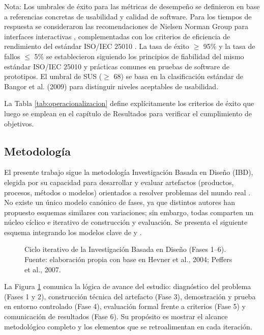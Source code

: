   \endgroup
  Nota: Los umbrales de éxito para las métricas de desempeño se definieron en base a referencias concretas de usabilidad y calidad de software. Para los tiempos de respuesta se consideraron las recomendaciones de Nielsen Norman Group para interfaces interactivas \parencite{NielsenNorman_interaction}, complementadas con los criterios de eficiencia de rendimiento del estándar ISO/IEC 25010 \parencite{ISO25010_2011}. La tasa de éxito $\geq$ 95\% y la tasa de fallos $\leq$ 5\% se establecieron siguiendo los principios de fiabilidad del mismo estándar ISO/IEC 25010 y prácticas comunes en pruebas de software de prototipos. El umbral de SUS ($\geq$ 68) se basa en la clasificación estándar de Bangor et al. (2009) para distinguir niveles aceptables de usabilidad.

  La Tabla \ref{tab:operacionalizacion} define explícitamente los criterios de éxito que luego se emplean en el capítulo de Resultados para verificar el cumplimiento de objetivos.

  \subsection{Metodología}

  El presente trabajo sigue la metodología Investigación Basada en Diseño (IBD), elegida por su capacidad para desarrollar y evaluar artefactos (productos, procesos, métodos o modelos) orientados a resolver problemas del mundo real \parencite{Hevner2004,Peffers2007}. No existe un único modelo canónico de fases, ya que distintos autores han propuesto esquemas similares con variaciones; sin embargo, todas comparten un núcleo cíclico e iterativo de construcción y evaluación. Se presenta el siguiente esquema integrando los modelos clave de \textcite{Hevner2004} y \textcite{Peffers2007}.

  \begin{figure}[htbp]
  \centering
  \resizebox{0.78\textwidth}{!}{}
  \caption[Ciclo iterativo (IBD)]{Ciclo iterativo de la Investigación Basada en Diseño (Fases 1--6). Fuente: elaboración propia con base en Hevner et al., 2004; Peffers et al., 2007.}
  \label{fig:ibd-ciclo}
  \end{figure}

  La Figura \ref{fig:ibd-ciclo} comunica la lógica de avance del estudio: diagnóstico del problema (Fases 1 y 2), construcción técnica del artefacto (Fase 3), demostración y prueba en entorno controlado (Fase 4), evaluación formal frente a criterios (Fase 5) y comunicación de resultados (Fase 6). Su propósito es mostrar el alcance metodológico completo y los elementos que se retroalimentan en cada iteración.

